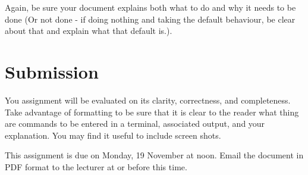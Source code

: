 \documentclass{article}
\begin{document}
Again, be sure your document explains both what to do and why it needs to be done (Or not done - if
doing nothing and taking the default behaviour, be clear about that and explain what that default is.).

\section{Submission}
You assignment will be evaluated on its clarity, correctness, and completeness. Take advantage of formatting to be
sure that it is clear to the reader what thing are commands to be entered in a terminal, associated output, and your 
explanation. You may find it useful to include screen shots.

This assignment is due on Monday, 19 November at noon.  Email the document in PDF format to the lecturer at or before this time.
\end{document}
